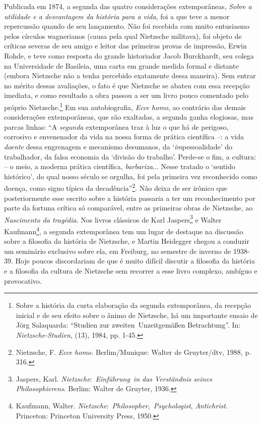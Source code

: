 \label{introduuxe7uxe3o}

Publicada em 1874, a segunda das quatro considerações extemporâneas,
\emph{Sobre a utilidade e a desvantagem da história para a vida}, foi a
que teve a menor repercussão quando de seu lançamento. Não foi recebida
com muito entusiasmo pelos círculos wagnerianos (causa pela qual
Nietz\-sche militava), foi objeto de críticas severas de seu amigo e
leitor das primeiras provas de impressão, Erwin Rohde, e teve como
resposta do grande historiador Jacob Burckhardt, seu colega na
Universidade de Basileia, uma carta em grande medida formal e distante
(embora Nietz\-sche não a tenha percebido exatamente dessa maneira). Sem
entrar no mérito dessas avaliações, o fato é que Nietz\-sche se abateu com
essa recepção imediata, e como resultado a obra passou a ser um livro
pouco comentado pelo próprio Nietz\-sche.\footnote{Sobre a história da
  curta elaboração da segunda extemporânea, da recepção inicial e de seu
  efeito sobre o ânimo de Nietz\-sche, há um importante ensaio de Jörg
  Salaquarda: ``Studien zur zweiten~Unzeitgemäßen Betrachtung''. In:
  \emph{Nietz\-sche-Studien}, (13), 1984, pp. 1-45.} Em sua autobiografia,
\emph{Ecce homo}, ao contrário das demais considerações extemporâneas,
que são exaltadas, a segunda ganha elogiosas, mas parcas linhas: ``A
\emph{segunda} extemporânea traz à luz o que há de perigoso, corrosivo e
envenenador da vida na nossa forma de prática científica --: a vida
\emph{doente} dessa engrenagem e mecanismo desumanos, da
`\emph{im}pessoalidade' do trabalhador, da falsa economia da `divisão
do trabalho'. Perde-se o fim, a cultura: -- o meio, a moderna prática
científica, \emph{barbariza}... Nesse tratado o `sentido histórico', do
qual nosso século se orgulha, foi pela primeira vez reconhecido como
doença, como signo típico da decadência''\footnote{Nietz\-sche, F.
  \emph{Ecce homo.} Berlim/Munique: Walter de Gruyter/dtv, 1988, p. 316.}.
Não deixa de ser irônico que posteriormente esse escrito sobre a
história passaria a ter um reconhecimento por parte da fortuna crítica
só comparável, entre as primeiras obras de Nietz\-sche, ao
\emph{Nascimento da tragédia}. Nos livros clássicos de Karl
Jaspers\footnote{Jaspers, Karl.
  \emph{Nietz\-sche}:~\emph{Einführung}~\emph{in das Verständnis seines
  Philosophierens}. Berlim: Walter de Gruyter, 1936.} e Walter
Kaufmann\footnote{Kaufmann, Walter.
  \emph{Nietz\-sche}:~\emph{Philosopher},~\emph{Psychologist},
  \emph{Antichrist}. Princeton: Princeton University Press, 1950.}, a
segunda extemporânea tem um lugar de destaque na discussão sobre a
filosofia da história de Nietz\-sche, e Martin Heidegger chegou a conduzir
um seminário exclusivo sobre ela, em Freiburg, no semestre de inverno de
1938-39. Hoje poucos discordariam de que é muito difícil discutir a
filosofia da história e a filosofia da cultura de Nietz\-sche sem recorrer
a esse livro complexo, ambíguo e provocativo.

